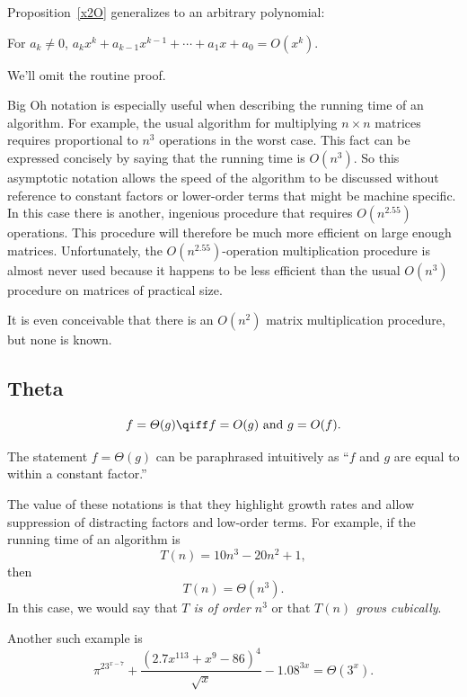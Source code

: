 Proposition~\ref{x2O} generalizes to an arbitrary polynomial:
\begin{proposition}
For $a_k\neq 0$, $a_k x^k + a_{k-1} x^{k-1} + \cdots + a_1x + a_0 = O(x^k)$.
\end{proposition}
We'll omit the routine proof.

Big Oh notation is especially useful when describing the running time of
an algorithm.  For example, the usual algorithm for multiplying $n \times
n$ matrices requires proportional to $n^3$ operations in the worst case.
This fact can be expressed concisely by saying that the running time is
$O(n^3)$.  So this asymptotic notation allows the speed of the algorithm
to be discussed without reference to constant factors or lower-order terms
that might be machine specific.  In this case there is another, ingenious
 procedure that requires $O(n^{2.55})$
operations.  This procedure will therefore be much more efficient on large
enough matrices.  Unfortunately, the $O(n^{2.55})$-operation
multiplication procedure is almost never used because it happens to be
less efficient than the usual $O(n^3)$ procedure on matrices of practical
size. 
\begin{staffnotes}
It is even conceivable that there is an $O(n^2)$ matrix
multiplication procedure, but none is known.
\end{staffnotes}

\subsection{\index{$\Theta()$}Theta}

\begin{definition}
\[
f = \varTheta(g)
\qiff
f=O(g) \text{ and } g=O(f).
\]
\end{definition}

The statement $f = \varTheta(g)$ can be paraphrased intuitively as ``$f$
and $g$ are equal to within a constant factor.''

The value of these notations is that they highlight growth rates and allow
suppression of distracting factors and low-order terms.  For example, if
the running time of an algorithm is
\[
T(n) = 10n^3 - 20n^2 + 1,
\]
then
\[
T(n) = \varTheta(n^3).
\]
In this case, we would say that \emph{$T$ is of order $n^3$} or that
\emph{$T(n)$ grows cubically}.

Another such example is
\[
{{\pi^23^{x-7} + \frac{(2.7x^{113} + x^9- 86)^4}{\sqrt{x}} - 1.08^{3x}}} =
\varTheta(3^x).
\]

